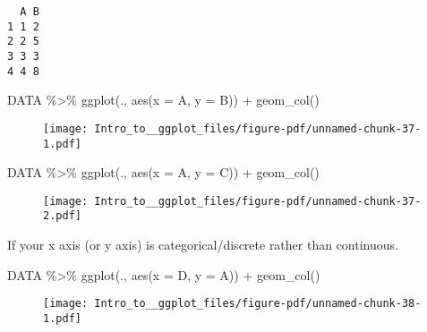 \documentclass[
  letterpaper,
  DIV=11,
  numbers=noendperiod]{scrartcl}
\newenvironment{Shaded}{\begin{snugshade}}{\end{snugshade}}
\newcommand{\AttributeTok}[1]{\textcolor[rgb]{0.40,0.45,0.13}{#1}}
\newcommand{\FunctionTok}[1]{\textcolor[rgb]{0.28,0.35,0.67}{#1}}
\newcommand{\NormalTok}[1]{\textcolor[rgb]{0.00,0.23,0.31}{#1}}
\newcommand{\SpecialCharTok}[1]{\textcolor[rgb]{0.37,0.37,0.37}{#1}}
\begin{document}
\begin{verbatim}
  A B
1 1 2
2 2 5
3 3 3
4 4 8
\end{verbatim}

\begin{Shaded}
\begin{Highlighting}[]
\NormalTok{DATA }\SpecialCharTok{\%\textgreater{}\%}
  \FunctionTok{ggplot}\NormalTok{(., }\FunctionTok{aes}\NormalTok{(}\AttributeTok{x =}\NormalTok{ A, }\AttributeTok{y =}\NormalTok{ B)) }\SpecialCharTok{+}
  \FunctionTok{geom\_col}\NormalTok{()}
\end{Highlighting}
\end{Shaded}

\begin{figure}[H]

{\centering \texttt{[image: Intro\_to\_\_ggplot\_files/figure-pdf/unnamed-chunk-37-1.pdf]}

}

\end{figure}

\begin{Shaded}
\begin{Highlighting}[]
\NormalTok{DATA }\SpecialCharTok{\%\textgreater{}\%}
  \FunctionTok{ggplot}\NormalTok{(., }\FunctionTok{aes}\NormalTok{(}\AttributeTok{x =}\NormalTok{ A, }\AttributeTok{y =}\NormalTok{ C)) }\SpecialCharTok{+}
  \FunctionTok{geom\_col}\NormalTok{()}
\end{Highlighting}
\end{Shaded}

\begin{figure}[H]

{\centering \texttt{[image: Intro\_to\_\_ggplot\_files/figure-pdf/unnamed-chunk-37-2.pdf]}

}

\end{figure}

If your x axis (or y axis) is categorical/discrete rather than
continuous.

\begin{Shaded}
\begin{Highlighting}[]
\NormalTok{DATA }\SpecialCharTok{\%\textgreater{}\%}
  \FunctionTok{ggplot}\NormalTok{(., }\FunctionTok{aes}\NormalTok{(}\AttributeTok{x =}\NormalTok{ D, }\AttributeTok{y =}\NormalTok{ A)) }\SpecialCharTok{+} 
  \FunctionTok{geom\_col}\NormalTok{()}
\end{Highlighting}
\end{Shaded}

\begin{figure}[H]

{\centering \texttt{[image: Intro\_to\_\_ggplot\_files/figure-pdf/unnamed-chunk-38-1.pdf]}

}

\end{figure}
\end{document}
